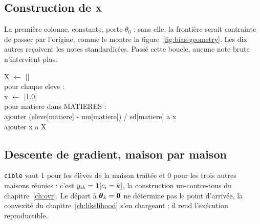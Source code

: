 \subsection{Construction de \texorpdfstring{$\mathbf{X}$}{X}}

La première colonne, constante, porte $\theta_0$ : sans elle, la frontière
serait contrainte de passer par l'origine, comme le montre la
figure~\ref{fig:bias-geometry}. Les dix autres reçoivent les notes
standardisées. Passé cette boucle, aucune note brute n'intervient plus.

\begin{pseudo}
X $\leftarrow$ []\\
pour chaque eleve :\\
\hspace*{2em}x $\leftarrow$ [1.0]\\
\hspace*{2em}pour matiere dans MATIERES :\\
\hspace*{4em}ajouter (eleve[matiere] - mu[matiere]) / sd[matiere] a x\\
\hspace*{2em}ajouter x a X
\end{pseudo}

\subsection{Descente de gradient, maison par maison}

\texttt{cible} vaut $1$ pour les élèves de la maison traitée et $0$ pour les
trois autres maisons réunies : c'est $y_{ik}=\mathbf{1}[c_i=k]$, la construction
un-contre-tous du chapitre~\ref{ch:ovr}. Le départ à $\boldsymbol{\theta}_k=\mathbf 0$ ne
détermine pas le point d'arrivée, la convexité du chapitre~\ref{ch:likelihood}
s'en chargeant ; il rend l'exécution reproductible.

